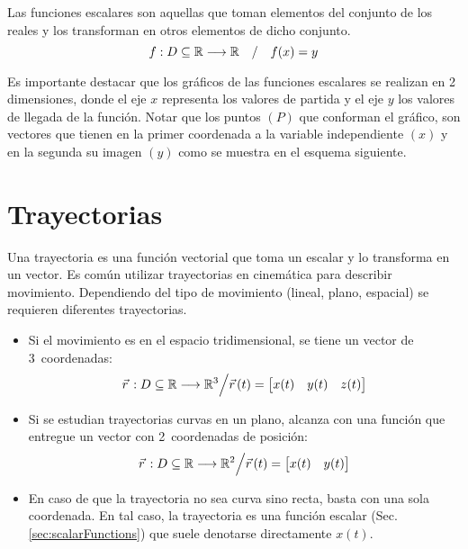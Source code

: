 Las funciones escalares son aquellas que toman elementos del conjunto de los reales y los transforman en otros elementos de dicho conjunto.
\[ f: D \subseteq \mathbb{R} \longrightarrow \mathbb{R} \quad / \quad f(x) = y \]

Es importante destacar que los gráficos de las funciones escalares se realizan en 2 dimensiones, donde el eje $x$ representa los valores de partida y el eje $y$ los valores de llegada de la función.
Notar que los puntos $(P)$ que conforman el gráfico, son vectores que tienen en la primer coordenada a la variable independiente $(x)$ y en la segunda su imagen $(y)$ como se muestra en el esquema siguiente.

\begin{center}
    \def\svgwidth{0.8\linewidth}
    
\end{center}


\section{Trayectorias}
\label{A:trajectory}

Una trayectoria es una función vectorial que toma un escalar y lo transforma en un vector.
Es común utilizar trayectorias en cinemática para describir movimiento.
Dependiendo del tipo de movimiento (lineal, plano, espacial) se requieren diferentes trayectorias.
\begin{itemize}
    \item
    Si el movimiento es en el espacio tridimensional, se tiene un vector de 3~coordenadas:
    \[
    \vec{r}\hspace{0.05cm}:D \subseteq \mathbb{R} \longrightarrow \mathbb{R}^3 \Big/ \vec{r}\hspace{0.05cm}(t) =
    \begin{bmatrix} x(t) & y(t) & z(t) \end{bmatrix}
    \]

    \item
    Si se estudian trayectorias curvas en un plano, alcanza con una función que entregue un vector con 2~coordenadas de posición:
    \[
    \vec{r}\hspace{0.05cm}:D \subseteq \mathbb{R} \longrightarrow \mathbb{R}^2 \Big/ \vec{r}\hspace{0.05cm}(t) =
    \begin{bmatrix} x(t) & y(t) \end{bmatrix}
    \]

    \item
    En caso de que la trayectoria no sea curva sino recta, basta con una sola coordenada.
    En tal caso, la trayectoria es una función escalar (Sec. \ref{sec:scalarFunctions}) que suele denotarse directamente $x(t)$.
\end{itemize}


